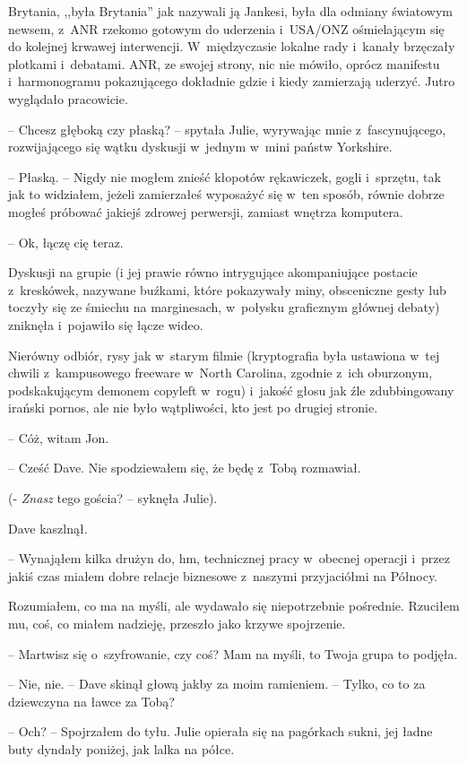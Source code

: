 \documentclass[oneside,polish,11pt,sfheadings]{mwbk}
\begin{document}
Brytania, ,,była Brytania'' jak nazywali ją Jankesi, była dla odmiany
światowym newsem, z~ANR rzekomo gotowym do uderzenia i~USA/ONZ
ośmielającym się do kolejnej krwawej interwencji. W~międzyczasie lokalne
rady i~kanały brzęczały plotkami i~debatami. ANR, ze swojej strony, nic
nie mówiło, oprócz manifestu i~harmonogramu pokazującego dokładnie gdzie
i kiedy zamierzają uderzyć. Jutro wyglądało pracowicie.

-- Chcesz głęboką czy płaską? -- spytała Julie, wyrywając mnie z~fascynującego, rozwijającego się wątku dyskusji w~jednym w~mini państw
Yorkshire.

-- Płaską. -- Nigdy nie mogłem znieść kłopotów rękawiczek, gogli i~sprzętu, tak jak to widziałem, jeżeli zamierzałeś wyposażyć się w~ten
sposób, równie dobrze mogłeś próbować jakiejś zdrowej perwersji, zamiast
wnętrza komputera.

-- Ok, łączę cię teraz.

Dyskusji na grupie (i jej prawie równo intrygujące akompaniujące
postacie z~kreskówek, nazywane buźkami, które pokazywały miny,
obsceniczne gesty lub toczyły się ze śmiechu na marginesach, w~połysku
graficznym głównej debaty) zniknęła i~pojawiło się łącze wideo.

Nierówny odbiór, rysy jak w~starym filmie (kryptografia była ustawiona w~tej chwili z~kampusowego freeware w~North Carolina, zgodnie z~ich
oburzonym, podskakującym demonem copyleft w~rogu) i~jakość głosu jak źle
zdubbingowany irański pornos, ale nie było wątpliwości, kto jest po
drugiej stronie.

-- Cóż, witam Jon.

-- Cześć Dave. Nie spodziewałem się, że będę z~Tobą rozmawiał.

(- \emph{Znasz }tego gościa? -- syknęła Julie).

Dave kaszlnął. 

-- Wynająłem kilka drużyn do, hm, technicznej pracy w~obecnej operacji i~przez jakiś czas miałem dobre relacje biznesowe z~naszymi przyjaciółmi na Północy.

Rozumiałem, co ma na myśli, ale wydawało się niepotrzebnie pośrednie.
Rzuciłem mu, coś, co miałem nadzieję, przeszło jako krzywe spojrzenie.

-- Martwisz się o~szyfrowanie, czy coś? Mam na myśli, to Twoja grupa to
podjęła.

-- Nie, nie. -- Dave skinął głową jakby za moim ramieniem. -- Tylko, co to
za dziewczyna na ławce za Tobą?

-- Och? -- Spojrzałem do tyłu. Julie opierała się na pagórkach sukni, jej
ładne buty dyndały poniżej, jak lalka na półce.
\end{document}

